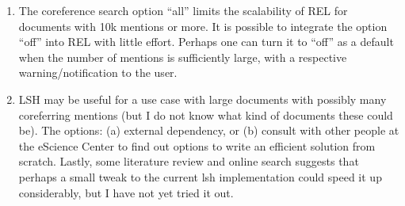 \documentclass[a4paper,11pt]{article}
\numberwithin{equation}{section} %
\begin{document}
\begin{enumerate}
 \item The coreference search option ``all'' limits the scalability of REL for documents with 10k mentions or more. It is possible to integrate the option ``off'' into REL with little effort. Perhaps one can turn it to ``off'' as a default when the number of mentions is sufficiently large, with a respective warning/notification to the user. 
 \item LSH may be useful for a use case with large documents with possibly many coreferring mentions (but I do not know what kind of documents these could be). The options: (a) external dependency, or (b) consult with other people at the eScience Center to find out options to write an efficient solution from scratch. Lastly, some literature review and online search suggests that perhaps a small tweak to the current lsh implementation could speed it up considerably, but I have not yet tried it out. 

\end{enumerate}








\end{document}
